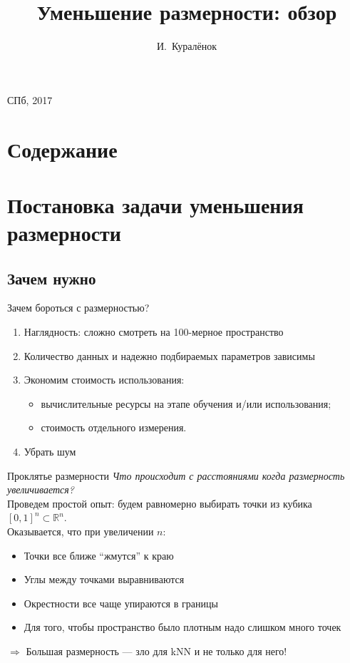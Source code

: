 \documentclass[14pt, fleqn, xcolor={dvipsnames, table}]{beamer}
\title{Уменьшение размерности: обзор\\\small{}}
\author[]{\small{%
И.~Куралёнок}}
\date{}
\begin{document}
\begin{frame}
\maketitle
\small
\begin{center}
\vspace{-60pt}
\normalsize
\vspace{80pt}
\footnotesize СПб, 2017
\end{center}
\end{frame}

\section{Содержание}
\section{Постановка задачи уменьшения размерности}
\subsection{Зачем нужно}
\begin{frame}{Зачем бороться с размерностью?}
\begin{enumerate}
  \item Наглядность: сложно смотреть на 100-мерное пространство
  \item Количество данных и надежно подбираемых параметров зависимы
  \item Экономим стоимость использования:
  \begin{itemize}
    \item вычислительные ресурсы на этапе обучения и/или использования;
    \item стоимость отдельного измерения.
  \end{itemize}
  \item Убрать шум
\end{enumerate}
\end{frame}

\begin{frame}{Проклятье размерности}
\small
\emph{Что происходит с расстояниями когда размерность увеличивается?} \\
Проведем простой опыт: будем равномерно выбирать точки из кубика $[0, 1]^n \subset \mathbb{R}^n$. \\
Оказывается, что при увеличении $n$:
\begin{itemize}
  \item Точки все ближе “жмутся” к краю
  \item Углы между точками выравниваются
  \item Окрестности все чаще упираются в границы
  \item Для того, чтобы пространство было плотным надо слишком много точек
\end{itemize}
$\Rightarrow$ Большая размерность — зло для kNN и не только для него!
\end{frame}
\end{document}
